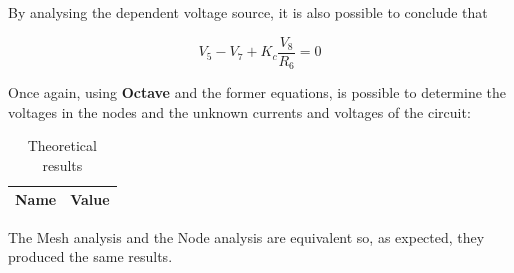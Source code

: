 By analysing the dependent voltage source, it is also possible to conclude that

\begin{equation}
  V_5 - V_7 + K_c\frac{V_8}{R_6} = 0
\end{equation}

\newpage

Once again, using {\bf Octave} and the former equations, is possible to determine the voltages in the nodes and the unknown currents and voltages of the circuit:

\begin{table}[H]
  \centering
  \begin{tabular}{|c|c|}
    \hline
        {\bf Name} & {\bf Value} \\
        \hline
        \hline
        
        \hline
  \end{tabular}
  \caption{Theoretical results}
  \label{node_res}
\end{table} 

The Mesh analysis and the Node analysis are equivalent so, as expected, they produced the same results.


